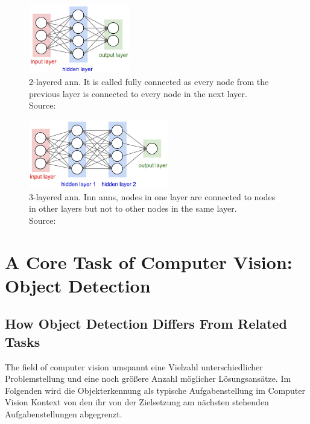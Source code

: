 \documentclass[
			   fontsize=11pt,
               paper=a4,
               bibliography=totoc,
               idxtotoc,
               headsepline,
               footsepline,
               footinclude=false,
               BCOR=12mm,
               DIV=13,
               openany,   %
               ]
               {scrbook}
\begin{document}
\begin{multicols}{2} %
	\begin{figure}[H] %
		\centering
		\includegraphics[height=3cm]{figures/ann1.jpeg}
		\caption[2-layered ANN]{2-layered \gls{ann}. It is called fully connected as every node from the previous layer is connected to every node in the next layer. \\
			\tiny{Source:~\cite{annGraphics}}}
		\label{fig:2layeredANN} %
	\end{figure}
	
	\columnbreak    %
	
	\begin{figure}[H] %
		\centering
		\includegraphics[height=3cm]{figures/ann2.jpeg}
		\caption[3-layered ANN]{3-layered \gls{ann}. Inn \glspl{ann}, nodes in one layer are connected to nodes in other layers but not to other nodes in the same layer. \\
			\tiny{Source:~\cite{annGraphics}}}
		\label{fig:3layeredANN} %
	\end{figure}
\end{multicols}

\section{A Core Task of Computer Vision: Object Detection}

\subsection{How Object Detection Differs From Related Tasks}

The field of computer vision umspannt eine Vielzahl unterschiedlicher Problemstellung und eine noch größere Anzahl möglicher Lösungsansätze. Im Folgenden wird die Objekterkennung als typische Aufgabenstellung im Computer Vision Kontext von den ihr von der Zielsetzung am nächsten stehenden Aufgabenstellungen abgegrenzt.
\end{document}
